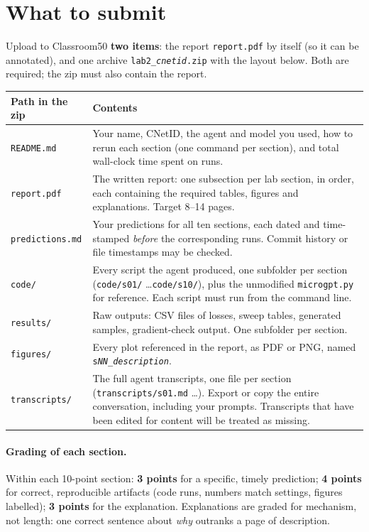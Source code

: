 \documentclass[11pt,letterpaper]{article}
\begin{document}
\section*{What to submit}

Upload to Classroom50 \textbf{two items}: the report \texttt{report.pdf} by itself (so it can be annotated), and one archive \texttt{lab2\_\textit{cnetid}.zip} with the layout below. Both are required; the zip must also contain the report.

\begin{center}\small
\begin{tabularx}{\textwidth}{@{}lX@{}}
\toprule
Path in the zip & Contents \\
\midrule
\texttt{README.md} & Your name, CNetID, the agent and model you used, how to rerun each section (one command per section), and total wall-clock time spent on runs. \\
\texttt{report.pdf} & The written report: one subsection per lab section, in order, each containing the required tables, figures and explanations. Target 8--14 pages. \\
\texttt{predictions.md} & Your predictions for all ten sections, each dated and time-stamped \emph{before} the corresponding runs. Commit history or file timestamps may be checked. \\
\texttt{code/} & Every script the agent produced, one subfolder per section (\texttt{code/s01/} \dots \texttt{code/s10/}), plus the unmodified \texttt{microgpt.py} for reference. Each script must run from the command line. \\
\texttt{results/} & Raw outputs: CSV files of losses, sweep tables, generated samples, gradient-check output. One subfolder per section. \\
\texttt{figures/} & Every plot referenced in the report, as PDF or PNG, named \texttt{s\textit{NN}\_\textit{description}}. \\
\texttt{transcripts/} & The full agent transcripts, one file per section (\texttt{transcripts/s01.md} \dots). Export or copy the entire conversation, including your prompts. Transcripts that have been edited for content will be treated as missing. \\
\bottomrule
\end{tabularx}
\end{center}

\paragraph{Grading of each section.} Within each 10-point section: \textbf{3 points} for a specific, timely prediction; \textbf{4 points} for correct, reproducible artifacts (code runs, numbers match settings, figures labelled); \textbf{3 points} for the explanation. Explanations are graded for mechanism, not length: one correct sentence about \emph{why} outranks a page of description.
\end{document}
